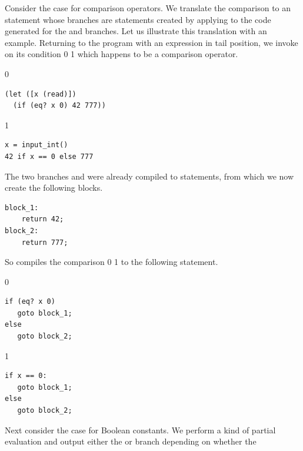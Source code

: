 \documentclass[7x10,nocrop]{TimesAPriori_MIT}%
\def\racketEd{0}
\def\pythonEd{1}
\def\edition{1}
\newcommand{\racket}[1]{{\if\edition\racketEd{#1}\fi}}
\newcommand{\python}[1]{{\if\edition\pythonEd #1\fi}}
\begin{document}
Consider the case for comparison operators. We translate the
comparison to an  statement whose branches are 
statements created by applying  to the code
generated for the  and  branches. Let us
illustrate this translation with an example.  Returning
to the program with an  expression in tail position,
we invoke  on its condition
\racket{}
\python{}
which happens to be a comparison operator.
{\if\edition\racketEd
\begin{lstlisting}
(let ([x (read)])
  (if (eq? x 0) 42 777))
\end{lstlisting}
  \fi}
{\if\edition\pythonEd
\begin{lstlisting}
x = input_int()
42 if x == 0 else 777
\end{lstlisting}
  \fi}
The two branches  and  were already compiled to 
statements, from which we now create the following blocks.
\begin{center}
\begin{minipage}{\textwidth}
\begin{lstlisting}
block_1:
    return 42;
block_2:
    return 777;
\end{lstlisting}
  \end{minipage}
\end{center}
%
So  compiles the comparison
\racket{}
\python{}
to the following  statement.
%
{\if\edition\racketEd
\begin{center}
\begin{minipage}{\textwidth}
\begin{lstlisting}
if (eq? x 0)
   goto block_1;
else
   goto block_2;
\end{lstlisting}
\end{minipage}
\end{center}
\fi}
{\if\edition\pythonEd
\begin{center}
\begin{minipage}{\textwidth}
\begin{lstlisting}
if x == 0:
   goto block_1;
else
   goto block_2;
\end{lstlisting}
\end{minipage}
\end{center}
\fi}
Next consider the case for Boolean constants. We perform a kind of
partial evaluation and output
either the  or  branch depending on whether the
\end{document}
